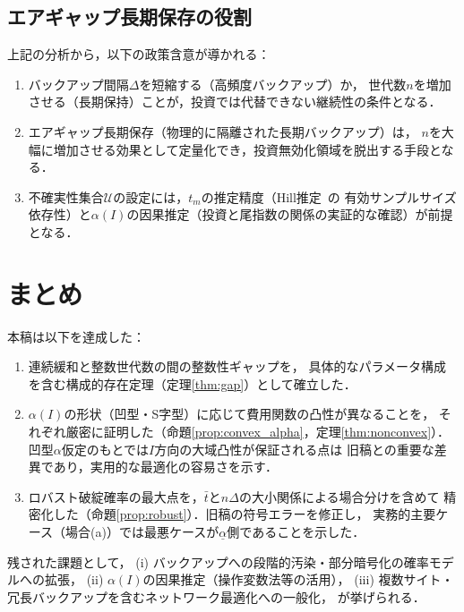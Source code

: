 \documentclass[12pt,a4paper]{article}
\theoremstyle{plain}
\theoremstyle{definition}
\theoremstyle{remark}
\newcommand{\calU}{\mathcal{U}}
\begin{document}
\subsection{エアギャップ長期保存の役割}

上記の分析から，以下の政策含意が導かれる：

\begin{enumerate}
  \item バックアップ間隔$\Delta$を短縮する（高頻度バックアップ）か，
    世代数$n$を増加させる（長期保持）ことが，投資では代替できない継続性の条件となる．
  \item エアギャップ長期保存（物理的に隔離された長期バックアップ）は，
    $n$を大幅に増加させる効果として定量化でき，投資無効化領域を脱出する手段となる．
  \item 不確実性集合$\calU$の設定には，$t_m$の推定精度（Hill推定~\cite{hill1975simple}の
    有効サンプルサイズ依存性）と$\alpha(I)$の因果推定（投資と尾指数の関係の実証的な確認）が前提となる．
\end{enumerate}

\section{まとめ}
\label{sec:conclusion}

本稿は以下を達成した：

\begin{enumerate}
  \item 連続緩和と整数世代数の間の整数性ギャップを，
    具体的なパラメータ構成を含む構成的存在定理（定理\ref{thm:gap}）として確立した．
  \item $\alpha(I)$の形状（凹型・S字型）に応じて費用関数の凸性が異なることを，
    それぞれ厳密に証明した（命題\ref{prop:convex_alpha}，定理\ref{thm:nonconvex}）．
    凹型$\alpha$仮定のもとでは$I$方向の大域凸性が保証される点は
    旧稿との重要な差異であり，実用的な最適化の容易さを示す．
  \item ロバスト破綻確率の最大点を，$\bar{t}$と$n\Delta$の大小関係による場合分けを含めて
    精密化した（命題\ref{prop:robust}）．旧稿の符号エラーを修正し，
    実務的主要ケース（場合(a)）では最悪ケースが$\underline{\alpha}$側であることを示した．
\end{enumerate}

残された課題として，
(i) バックアップへの段階的汚染・部分暗号化の確率モデルへの拡張，
(ii) $\alpha(I)$の因果推定（操作変数法等の活用），
(iii) 複数サイト・冗長バックアップを含むネットワーク最適化への一般化，
が挙げられる．
\end{document}
